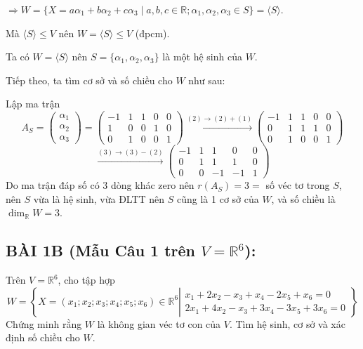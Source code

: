 \documentclass[12pt,a4paper]{article}
\newcommand{\R}{\mathbb{R}}
\begin{document}
$\Rightarrow W = \{ X = a\alpha_1 + b\alpha_2 + c\alpha_3 \mid a, b, c \in \R; \alpha_1, \alpha_2, \alpha_3 \in S \} = \langle S \rangle$.

Mà $\langle S \rangle \le V$ nên $W = \langle S \rangle \le V$ (đpcm).

Ta có $W = \langle S \rangle$ nên $S = \{ \alpha_1, \alpha_2, \alpha_3 \}$ là một hệ sinh của $W$.

Tiếp theo, ta tìm cơ sở và số chiều cho $W$ như sau:

Lập ma trận
\[
A_S = \begin{pmatrix} \alpha_1 \\ \alpha_2 \\ \alpha_3 \end{pmatrix} = \begin{pmatrix} -1 & 1 & 1 & 0 & 0 \\ 1 & 0 & 0 & 1 & 0 \\ 0 & 1 & 0 & 0 & 1 \end{pmatrix} 
\xrightarrow{(2) \to (2) + (1)} \begin{pmatrix} -1 & 1 & 1 & 0 & 0 \\ 0 & 1 & 1 & 1 & 0 \\ 0 & 1 & 0 & 0 & 1 \end{pmatrix} 
\]
\[
\xrightarrow{(3) \to (3) - (2)} \begin{pmatrix} -1 & 1 & 1 & 0 & 0 \\ 0 & 1 & 1 & 1 & 0 \\ 0 & 0 & -1 & -1 & 1 \end{pmatrix}
\]
Do ma trận đáp số có 3 dòng khác zero nên $r(A_S) = 3 = $ số véc tơ trong $S$, nên $S$ vừa là hệ sinh, vừa ĐLTT nên $S$ cũng là 1 cơ sở của $W$, và số chiều là $\dim_{\R} W = 3$.

\vspace{0.3cm}

\subsection*{BÀI 1B (Mẫu Câu 1 trên $V = \R^6$):}
Trên $V=\R^6$, cho tập hợp
\[
W = \left\{ X = (x_1; x_2; x_3; x_4; x_5; x_6) \in \R^6 \left| \begin{matrix} x_1 + 2x_2 - x_3 + x_4 - 2x_5 + x_6 = 0 \\ 2x_1 + 4x_2 - x_3 + 3x_4 - 3x_5 + 3x_6 = 0 \end{matrix} \right. \right\}
\]
Chứng minh rằng $W$ là không gian véc tơ con của $V$. Tìm hệ sinh, cơ sở và xác định số chiều cho $W$.
\end{document}
